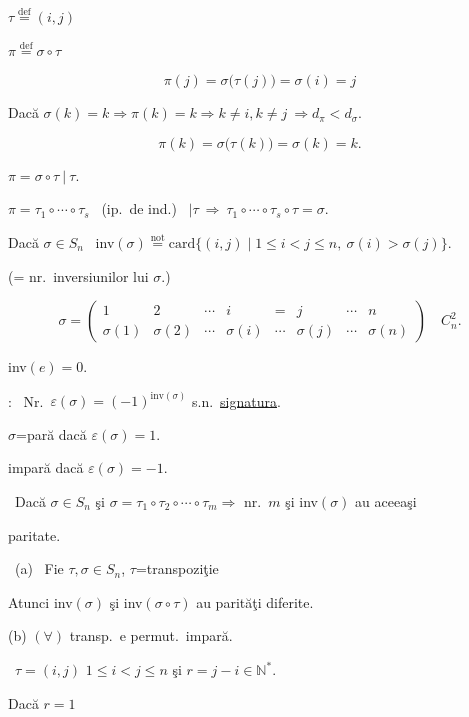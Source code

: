 \documentclass[12pt]{article}
\begin{document}
\noindent $\tau \overset{\text{def}}{=} (i,j)$

\noindent $\pi \overset{\text{def}}{=} \sigma\circ\tau$

\[
\pi(j) = \sigma\big(\tau(j)\big) = \sigma(i) = j
\]

\bigskip
\noindent Dacă $\sigma(k)=k \Rightarrow \pi(k)=k \Rightarrow k\neq i, k\neq j \ \Rightarrow d_\pi<d_\sigma.$

\[
\pi(k) = \sigma\big(\tau(k)\big) = \sigma(k) = k.
\]

\noindent $\pi = \sigma\circ\tau \ \big| \ \tau.$

\bigskip
\noindent $\pi = \tau_1\circ\cdots\circ\tau_s$ \ (ip.\ de ind.) \ $\big|\tau \ \Rightarrow \ \tau_1\circ\cdots\circ\tau_s\circ\tau=\sigma.$

\bigskip
\noindent Dacă $\sigma\in S_n$ \ inv$(\sigma) \overset{\text{not}}{=} \text{card}\{(i,j) \mid 1\leq i<j\leq n,\ \sigma(i)>\sigma(j)\}.$

\noindent (= nr.\ inversiunilor lui $\sigma$.)

\[
\sigma = \begin{pmatrix}1&2&\cdots&i&=&j&\cdots&n\\ \sigma(1)&\sigma(2)&\cdots&\sigma(i)&\cdots&\sigma(j)&\cdots&\sigma(n)\end{pmatrix} \quad C_n^2.
\]

\noindent inv$(e)=0$.

\bigskip
\noindent{}: \ Nr.\ $\varepsilon(\sigma) = (-1)^{\text{inv}(\sigma)}$ s.n.\ \underline{signatura}.

\bigskip
\noindent $\sigma$=pară dacă $\varepsilon(\sigma)=1$.

\noindent \phantom{$\sigma$=}impară dacă $\varepsilon(\sigma)=-1$.

\bigskip
\noindent{} \ Dacă $\sigma\in S_n$ şi $\sigma=\tau_1\circ\tau_2\circ\cdots\circ\tau_m \Rightarrow$ nr.\ $m$ şi inv$(\sigma)$ au aceeaşi

\noindent paritate.

\bigskip
\noindent{} \ (a) \ Fie $\tau,\sigma\in S_n$, $\tau$=transpoziţie

\noindent Atunci inv$(\sigma)$ şi inv$(\sigma\circ\tau)$ au parităţi diferite.

\noindent (b) $(\forall)$ transp.\ e permut.\ impară.

\bigskip
\noindent{} \ $\tau=(i,j)$ \quad $1\leq i<j\leq n$ şi $r=j-i\in\mathbb{N}^*$.

\bigskip
\noindent Dacă $r=1$
\end{document}
